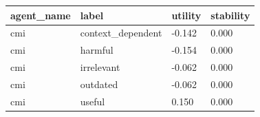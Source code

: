 \begin{tabular}{llll}
\toprule
agent\_name & label & utility & stability \\
\midrule
cmi & context\_dependent & -0.142 & 0.000 \\
cmi & harmful & -0.154 & 0.000 \\
cmi & irrelevant & -0.062 & 0.000 \\
cmi & outdated & -0.062 & 0.000 \\
cmi & useful & 0.150 & 0.000 \\
\bottomrule
\end{tabular}
